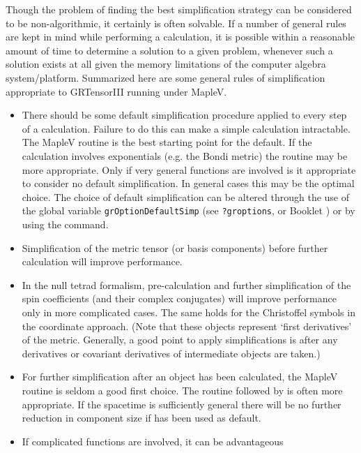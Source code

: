 \documentclass{article}
\begin{document}
{{{Though the problem of finding the best simplification strategy can be
considered to be non-algorithmic, it certainly is often solvable. If a
number of general rules are kept in mind while performing a
calculation, it is possible within a reasonable amount of time to
determine a solution to a given problem, whenever such a solution
exists at all given the memory limitations of the computer algebra
system/platform. Summarized here are some general rules of
simplification appropriate to GRTensorIII running under MapleV.

\begin{itemize}
  \item There should be some default simplification procedure applied
    to every step of a calculation. Failure to do this can make a
    simple calculation intractable. The MapleV routine 
    is the best starting point for the default. If the calculation
    involves exponentials (e.g. the Bondi metric) the routine
     may be more appropriate. Only if very general
    functions are involved is it appropriate to consider no default
    simplification. In general cases this may be the optimal
    choice. The choice of default simplification can be altered
    through the use of the global variable
    \texttt{grOptionDefaultSimp} (see \texttt{?groptions}, or Booklet
    \grSetupRef) or by using the  command.
%
  \item Simplification of the metric tensor (or basis components)
    before further calculation will improve performance.
%
  \item In the null tetrad formalism, pre-calculation and further
    simplification of the spin coefficients (and their complex
    conjugates) will improve performance only in more complicated
    cases. The same holds for the Christoffel symbols in the
    coordinate approach. (Note that these objects represent `first
    derivatives' of the metric. Generally, a good point to apply
    simplifications is after any derivatives or covariant derivatives
    of intermediate objects are taken.)
%
  \item For further simplification after an object has been
    calculated, the MapleV routine  is seldom a good
    first choice. The routine  followed by
     is often more appropriate. If the spacetime is
    sufficiently general there will be no further reduction in
    component size if  has been used as default.
%
  \item If complicated functions are involved, it can be advantageous

\end{itemize}}}}
\end{document}
